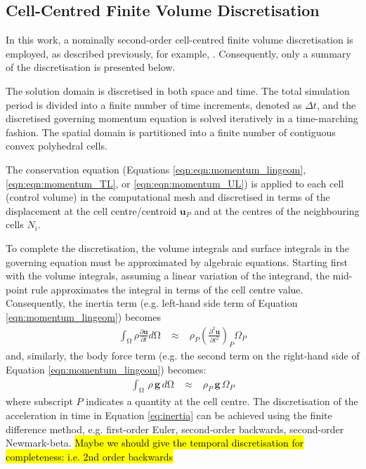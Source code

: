 \documentclass[sn-mathphys,Numbered]{sn-jnl}%
\newcommand{\bb}{\boldsymbol}
\begin{document}
\subsection{Cell-Centred Finite Volume Discretisation}
\label{sec:discretisation}
In this work, a nominally second-order cell-centred finite volume discretisation is employed, as described previously, for example, \citep{cardiff_lagrangian_2017, Batistic, Tukovic, Jasak}.
Consequently, only a summary of the discretisation is presented below.

The solution domain is discretised in both space and time.
The total simulation period is divided into a finite number of time increments, denoted as $\Delta t$, and the discretised governing momentum equation is solved iteratively in a time-marching fashion. The spatial domain is partitioned into a finite number of contiguous convex polyhedral cells.

The conservation equation (Equations \ref{eqn:eqn:momentum_lingeom}, \ref{eqn:eqn:momentum_TL}, or \ref{eqn:eqn:momentum_UL}) is applied to each cell (control volume) in the computational mesh and discretised in terms of the displacement at the cell centre/centroid $\bb{u}_P$ and at the centres of the neighbouring cells $N_i$.

To complete the discretisation, the volume integrals and surface integrals in the governing equation must be approximated by algebraic equations.
Starting first with the volume integrals, assuming a linear variation of the integrand, the mid-point rule approximates the integral in terms of the cell centre value.
Consequently, the inertia term (e.g. left-hand side term of Equation \ref{eqn:momentum_lingeom}) becomes
\begin{eqnarray} \label{eq:inertia}
	\int_{\mathrm{\Omega}} \rho \frac{\partial \bb{u} }{\partial t}  d\mathrm{\Omega}
	\;&\approx&\;
	\rho_P \left(\frac{\partial^2 \bb{u} }{\partial t^2}\right)_P  \Omega_P
\end{eqnarray}
and, similarly, the body force term (e.g. the second term on the right-hand side of Equation \ref{eqn:momentum_lingeom}) becomes:
\begin{eqnarray}
	\int_{\mathrm{\Omega}} \, \rho \, \bb{g} \,  d\mathrm{\Omega}
	\;&\approx&\;
	\rho_P \, \bb{g}\,  \Omega_P
\end{eqnarray}
where subscript $P$ indicates a quantity at the cell centre.
The discretisation of the acceleration in time in Equation \ref{eq:inertia} can be achieved using the finite difference method, e.g. first-order Euler, second-order backwards, second-order Newmark-beta.
\hl{Maybe we should give the temporal discretisation for completeness: i.e. 2nd order backwards}
\end{document}
